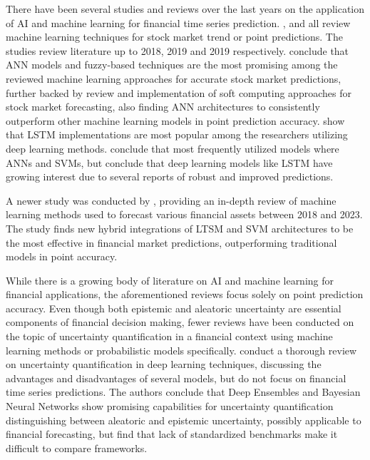 There have been several studies and reviews over the last years on the application of AI and machine learning for financial time series prediction. \textcite{gandhmalstockmarket2019}, \textcite{Li2020} and \textcite{Kumbure2022} all review machine learning techniques for stock market trend or point predictions. The studies review literature up to 2018, 2019 and 2019 respectively. \textcite{gandhmalstockmarket2019} conclude that ANN models and fuzzy-based techniques are the most promising among the reviewed machine learning approaches for accurate stock market predictions, further backed by \textcite{shi2019soft} review and implementation of soft computing approaches for stock market forecasting, also finding ANN architectures to consistently outperform other machine learning models in point prediction accuracy. \textcite{Li2020} show that LSTM implementations are most popular among the researchers utilizing deep learning methods. \textcite{Kumbure2022} conclude that most frequently utilized models where ANNs and SVMs, but conclude that deep learning models like LSTM have growing interest due to several reports of robust and improved predictions. 

A newer study was conducted by \textcite{Khattak2023SurveyAIModels}, providing an in-depth review of machine learning methods used to forecast various financial assets between 2018 and 2023. The study finds new hybrid integrations of LTSM and SVM architectures to be the most effective in financial market predictions, outperforming traditional models in point accuracy.

While there is a growing body of literature on AI and machine learning for financial applications, the aforementioned reviews focus solely on point prediction accuracy. Even though both epistemic and aleatoric uncertainty are essential components of financial decision making, fewer reviews have been conducted on the topic of uncertainty quantification in a financial context using machine learning methods or probabilistic models specifically. \textcite{abdar2021ReviewUQ} conduct a thorough review on uncertainty quantification in deep learning techniques, discussing the advantages and disadvantages of several models, but do not focus on financial time series predictions. The authors conclude that Deep Ensembles and Bayesian Neural Networks show promising capabilities for uncertainty quantification distinguishing between aleatoric and epistemic uncertainty, possibly applicable to financial forecasting, but find that lack of standardized benchmarks make it difficult to compare frameworks.

